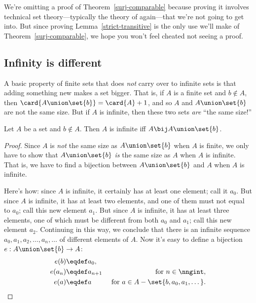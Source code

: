 We're omitting a proof of Theorem~\ref{surj-comparable} because
proving it involves technical set theory---typically the theory of
 again---that we're not going to get into.  But since
proving Lemma~\ref{strict-transitive} is the only use we'll make of
Theorem~\ref{surj-comparable}, we hope you won't feel cheated not
seeing a proof.

\subsection{Infinity is different}

A basic property of finite sets that does \emph{not} carry over to
infinite sets is that adding something new makes a set bigger.  That
is, if $A$ is a finite set and $b \notin A$, then $\card{A \union
  \set{b}} = \card{A}+1$, and so $A$ and $A \union \set{b}$ are not
the same size.  But if $A$ is infinite, then these two sets \emph{are}
``the same size!''

\begin{lemma}\label{AUb}
  Let $A$ be a set and $b \notin A$.  Then $A$ is infinite iff $A \bij
  A \union \set{b}$.
\end{lemma}
\begin{proof}
Since $A$ is \emph{not} the same size as $A \union \set{b}$ when $A$
is finite, we only have to show that $A \union \set{b}$ \emph{is} the
same size as $A$ when $A$ is infinite.  That is, we have to find a
bijection between $A \union \set{b}$ and $A$ when $A$ is infinite.

Here's how: since $A$ is infinite, it certainly has at least one
element; call it $a_0$.  But since $A$ is infinite, it has at least
two elements, and one of them must not equal to $a_0$; call this new
element $a_1$.  But since $A$ is infinite, it has at least three
elements, one of which must be different from both $a_0$ and $a_1$; call this
new element $a_2$.  Continuing in this way, we conclude that there is
an infinite sequence $a_0,a_1,a_2,\dots,a_n,\dots$ of different
elements of $A$.  Now it's easy to define a bijection $e: A \union
\set{b} \to A$:
\begin{align*}
e(b) & \eqdef a_0,\\
e(a_n) & \eqdef a_{n+1}
          & \text{ for } n \in \nngint,\\
e(a) & \eqdef a
          & \text{ for } a \in A - \set{b,a_0,a_1,\dots}.
\end{align*}
\end{proof}

